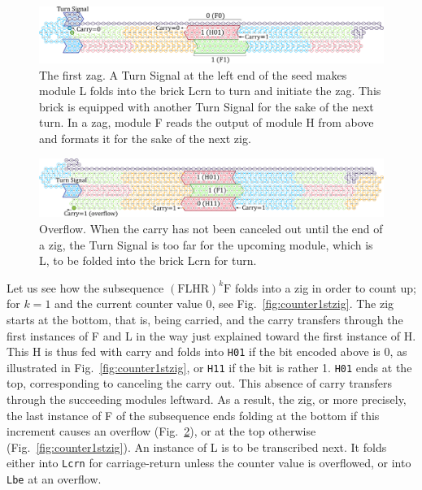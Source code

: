 \documentclass[twocolumn]{svjour3}
\begin{document}
\begin{figure}[tb]
\centering
\includegraphics[width=\linewidth]{fig/svg/CounterEx11_1.pdf}
\caption{
The first zag. 
A Turn Signal at the left end of the seed makes module L folds into the brick Lcrn to turn and initiate the zag. 
This brick is equipped with another Turn Signal for the sake of the next turn. 
In a zag, module F reads the output of module H from above and formats it for the sake of the next zig. 
}
\label{fig:counter1stzag}
\end{figure}

\begin{figure}[tb]
\centering
\includegraphics[width=\linewidth]{fig/svg/CounterEx13_1.pdf}
\caption{
Overflow. 
When the carry has not been canceled out until the end of a zig, the Turn Signal is too far for the upcoming module, which is L, to be folded into the brick Lcrn for turn. 
}
\label{fig:overflowex1}
\end{figure}

Let us see how the subsequence $(\mathrm{FLHR})^k \mathrm{F}$ folds into a zig in order to count up; for $k=1$ and the current counter value 0, see Fig.~\ref{fig:counter1stzig}.
The zig starts at the bottom, that is, being carried, and the carry transfers through the first instances of F and L in the way just explained toward the first instance of H.
This H is thus fed with carry and folds into \texttt{H01} if the bit encoded above is 0, as illustrated in Fig.~\ref{fig:counter1stzig}, or \texttt{H11} if the bit is rather 1.
\texttt{H01} ends at the top, corresponding to canceling the carry out.
This absence of carry transfers through the succeeding modules leftward.
As a result, the zig, or more precisely, the last instance of F of the subsequence ends folding at the bottom if this increment causes an overflow (Fig.~\ref{fig:overflowex1}), or at the top otherwise (Fig.~\ref{fig:counter1stzig}).
An instance of L is to be transcribed next.
It folds either into \texttt{Lcrn} for carriage-return unless the counter value is overflowed, or into \texttt{Lbe} at an overflow.
\end{document}
